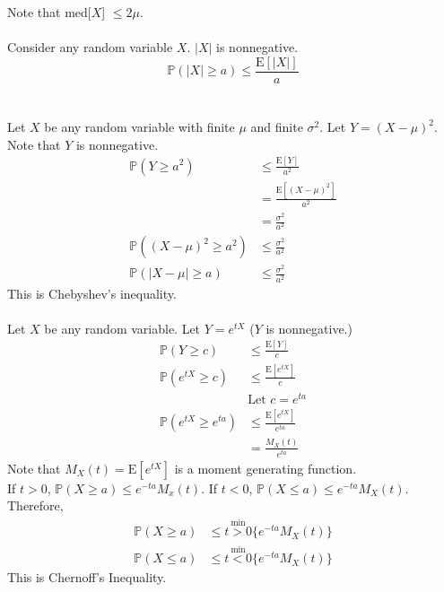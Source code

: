 \documentclass[12pt]{article}
\newcommand{\prob}[1]{\mathbb{P}(#1)}
\newcommand{\expected}[1]{\mathrm{E}[#1]}
\begin{document}
Note that med[$X$] $\leq 2\mu$. \\~\\
Consider any random variable $X$. $|X|$ is nonnegative. 
$$ \prob{|X| \geq a} \leq \frac{\expected{|X|}}{a} $$ \\~\\
Let $X$ be any random variable with finite $\mu$ and finite $\sigma^2$. Let $Y = (X-\mu)^2$. Note that $Y$ is nonnegative. $$ \begin{aligned} \prob{Y \geq a^2} &\leq \frac{\expected{Y}}{a^2} \\ &= \frac{\expected{(X - \mu)^2}}{a^2} \\ &= \frac{\sigma^2}{a^2} \\ \prob{(X - \mu)^2 \geq a^2} &\leq \frac{\sigma^2}{a^2} \\ \prob{|X - \mu| \geq a} &\leq \frac{\sigma^2}{a^2} \end{aligned} $$ This is Chebyshev's inequality. \\~\\
Let $X$ be any random variable. Let $Y = e^{tX}$ ($Y$ is nonnegative.) $$ \begin{aligned} 
\prob{Y \geq c} &\leq \frac{\expected{Y}}{c} \\ \prob{e^{tX} \geq c} &\leq \frac{\expected{e^{tX}}}{c} \\ &\text{Let } c = e^{ta} \\ \prob{e^{tX} \geq e^{ta}} &\leq \frac{\expected{e^{tX}}}{e^{ta}} \\ &= \frac{M_X(t)}{e^{ta}} \end{aligned} $$ Note that $M_X(t) = \expected{e^{tX}} $ is a moment generating function. \\
If $t > 0$, $\prob{X \geq a} \leq e^{-ta}M_x(t)$. If $t < 0$, $\prob{X \leq a} \leq e^{-ta}M_X(t)$. \\
Therefore, $$ \begin{aligned} \prob{X \geq a} &\leq \stackrel{\text{min}}{t > 0} \{ e^{-ta} M_X(t)\} \\ \prob{X \leq a} &\leq \stackrel{\text{min}}{t < 0} \{ e^{-ta}M_X(t)\} \end{aligned} $$ This is Chernoff's Inequality. \\~\\
\end{document}
